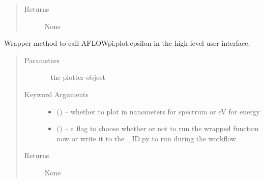 \documentclass[letterpaper,10pt,english]{sphinxmanual}
\begin{document}
\begin{fulllineitems}
\begin{fulllineitems}
\begin{quote}
\begin{description}
\begin{itemize}
\end{itemize}

\item[{Returns}] \leavevmode
None

\end{description}\end{quote}

\end{fulllineitems}


\begin{fulllineitems}
\label{\detokenize{prep:prep.tb_plotter.transport}}
Wrapper method to call AFLOWpi.plot.epsilon in the high level user interface.
\begin{quote}\begin{description}
\item[{Parameters}] \leavevmode
{} -- the plotter object

\item[{Keyword Arguments}] \leavevmode\begin{itemize}
\item {} 
 () -- whether to plot in nanometers for spectrum or eV for energy

\item {} 
 () -- a flag to choose whether or not to run the wrapped function now
or write it to the \_ID.py to run during the workflow

\end{itemize}

\item[{Returns}] \leavevmode
None

\end{description}\end{quote}

\end{fulllineitems}


\end{fulllineitems}

\end{document}
